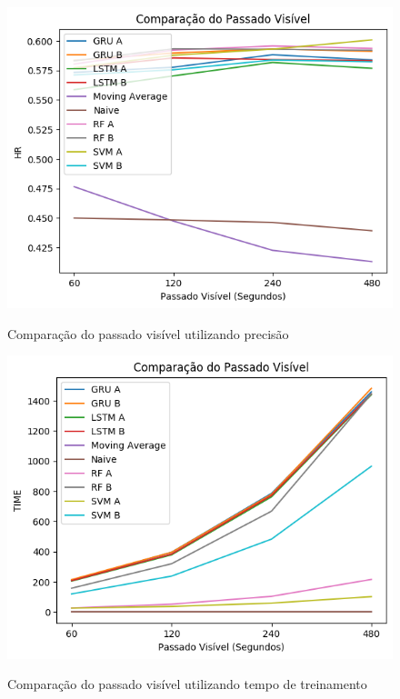 \begin{figure}[htbp]
    \centering
    \includegraphics[scale=0.8]{monography/img/comparisons/comparacao_do_passado_visivel_hr.png}
    \label{figure:passado_visivel_hr}
    \caption{Comparação do passado visível utilizando precisão}
\end{figure}

\begin{figure}[htbp]
    \centering
    \includegraphics[scale=0.8]{monography/img/comparisons/comparacao_do_passado_visivel_time.png}
    \label{figure:passado_visivel_time}
    \caption{Comparação do passado visível utilizando tempo de treinamento}
\end{figure}

